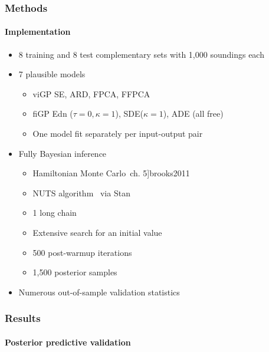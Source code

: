 \documentclass{snedecorbeamer}
\newcommand{\citep}[1]{}
\begin{document}
\begin{frame}
  \frametitle{Methods}
  \framesubtitle{Implementation}

  \begin{itemize}
  \item 8 training and 8 test complementary sets with 1,000 soundings each
  \item 7 plausible models
    \begin{itemize}
    \item viGP SE, ARD, FPCA, FFPCA
    \item fiGP Edn ($\tau=0,\kappa=1$), SDE($\kappa=1$), ADE (all free)
    \item One model fit separately per input-output pair
    \end{itemize}
  \item Fully Bayesian inference
    \begin{itemize}
    \item Hamiltonian Monte Carlo~\citep[ch. 5]{brooks2011}
    \item NUTS algorithm~\citep{hoffman2014} via
      Stan~\citep{standevelopmentteam2021}
    \item 1 long chain~\citep{raftery1992}
    \item Extensive search for an initial value
    \item 500 post-warmup iterations
    \item 1,500 posterior samples
    \end{itemize}
  \item Numerous out-of-sample validation statistics
  \end{itemize}
\end{frame}

\begin{frame}[c]
  \frametitle{Results}
  \framesubtitle{Posterior predictive validation}

  \begin{table}
    \caption*{%
      Mean validation statistics:~RMSE (left) and negative PPLD (right).\\
      Smaller values are better. Bold is best in class.
    }%
    \label{tab:validation-statistics-mini}
  \end{table}

\end{frame}
\end{document}
